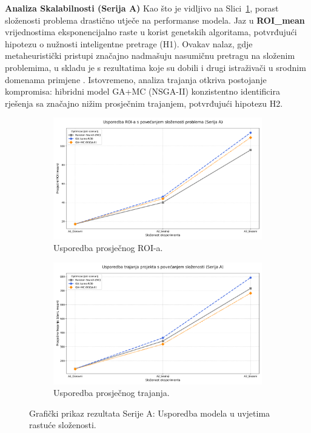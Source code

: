 \textbf{Analiza Skalabilnosti (Serija A)}
Kao što je vidljivo na Slici~\ref{fig:a_skalabilnost}, porast složenosti problema drastično utječe na performanse modela. Jaz u \textbf{ROI\_mean} vrijednostima eksponencijalno raste u korist genetskih algoritama, potvrđujući hipotezu o nužnosti inteligentne pretrage (H1). Ovakav nalaz, gdje metaheuristički pristupi značajno nadmašuju nasumičnu pretragu na složenim problemima, u skladu je s rezultatima koje su dobili i drugi istraživači u srodnim domenama primjene \cite{Gandomi2013}. Istovremeno, analiza trajanja otkriva postojanje kompromisa: hibridni model GA+MC (NSGA-II) konzistentno identificira rješenja sa značajno nižim prosječnim trajanjem, potvrđujući hipotezu H2.

\begin{figure}[H]
    \centering
    \begin{subfigure}[b]{0.48\textwidth}
        \centering
        \includegraphics[width=\textwidth]{slike/grafikoni_final/A_skalabilnost_roi.png}
        \caption{Usporedba prosječnog ROI-a.}
    \end{subfigure}
    \hfill
    \begin{subfigure}[b]{0.48\textwidth}
        \centering
        \includegraphics[width=\textwidth]{slike/grafikoni_final/A_skalabilnost_trajanje.png}
        \caption{Usporedba prosječnog trajanja.}
    \end{subfigure}
    \caption{Grafički prikaz rezultata Serije A: Usporedba modela u uvjetima rastuće složenosti.}
    \label{fig:a_skalabilnost}
\end{figure}

